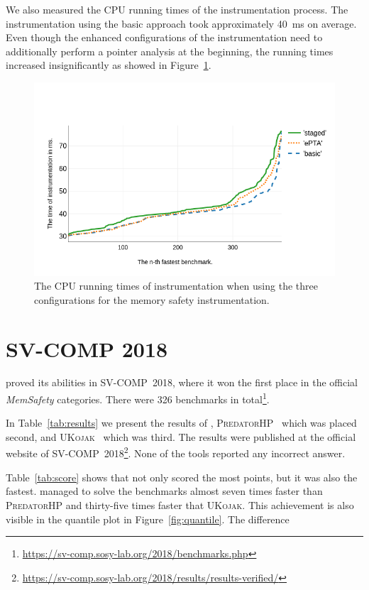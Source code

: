 We also measured the CPU running times of the instrumentation process. The
instrumentation using the basic approach took approximately 40~ms on average.
Even though the enhanced configurations of the instrumentation need to
additionally perform a pointer analysis at the beginning, the running times increased
insignificantly as showed in Figure~\ref{fig:times_chart}.

\begin{figure}[h]
  \includegraphics[width=\textwidth]{charts/instr_times_chart.png}
  \caption{The CPU running times of instrumentation when using
  the three configurations for the memory safety instrumentation.}
  \label{fig:times_chart}
\end{figure}

\section{SV-COMP 2018}

\symbiotic proved its abilities in SV-COMP~2018, where it won the first place
in the official \emph{MemSafety} categories. There were 326 benchmarks in
total\footnote{\url{https://sv-comp.sosy-lab.org/2018/benchmarks.php}}.

In Table~\ref{tab:results} we present the results of \symbiotic,
\textsc{PredatorHP}~\cite{predatorhp} which was placed second, and \textsc{UKojak}~\cite{ukojak} which was
third. The results were published at the official website of
SV-COMP~2018\footnote{\url{https://sv-comp.sosy-lab.org/2018/results/results-verified/}}.
None of the tools reported any incorrect answer.


Table~\ref{tab:score} shows that not only \symbiotic scored the most points,
but it was also the fastest. \symbiotic managed to solve the benchmarks almost
seven times faster than \textsc{PredatorHP} and thirty-five times faster that
\textsc{UKojak}. This achievement is also visible in the quantile plot in
Figure~\ref{fig:quantile}. The difference


